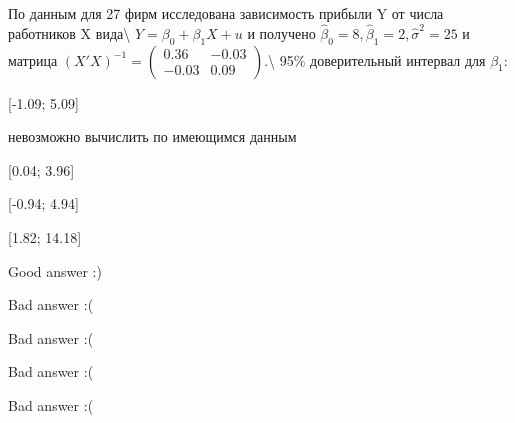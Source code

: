
\begin{question}
По данным для 27 фирм исследована зависимость прибыли Y от числа работников X вида\textbackslash{}
\(Y = \beta_0 + \beta_1 X + u\)
и получено \(\hat \beta_0 = 8, \hat \beta_1 = 2, \hat \sigma^2 = 25\) и матрица \((X'X)^{-1} = \begin{pmatrix}
0.36 & -0.03 \\
-0.03 & 0.09
\end{pmatrix}\).\textbackslash{} 95\% доверительный интервал для \(\beta_1\):
\begin{answerlist}
  \item {[}-1.09; 5.09{]}
  \item невозможно вычислить по имеющимся данным
  \item {[}0.04; 3.96{]}
  \item {[}-0.94; 4.94{]}
  \item {[}1.82; 14.18{]}
\end{answerlist}
\end{question}

\begin{solution}
\begin{answerlist}
  \item Good answer :)
  \item Bad answer :(
  \item Bad answer :(
  \item Bad answer :(
  \item Bad answer :(
\end{answerlist}
\end{solution}

